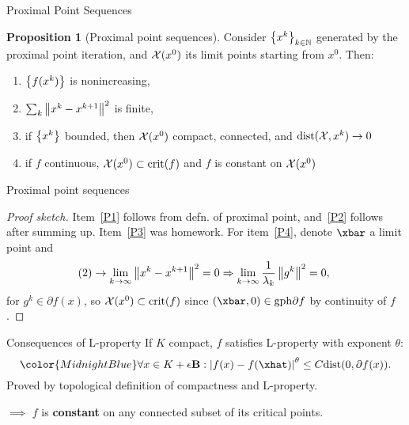 \documentclass[usenames, dvipsnames, 10pt]{beamer}
\theoremstyle{definition}
\newtheorem{proposition}{Proposition}
\begin{document}
\begin{frame}{Proximal Point Sequences}
    \begin{proposition}[Proximal point sequences] \vspace{1pt}
    Consider $\left\{ x^k \right\}_{k \in \mathbb{N}}$ generated by the proximal point iteration,
    and $\mathcal{X}(x^0)$ its limit points starting from $x^0$. Then:
    \begin{enumerate}
    \item \label{P1} $\left\{ f(x^k) \right\}$ is nonincreasing,
    \item \label{P2} $\sum_k \left \| x^k - x^{k+1} \right \|^2$ is finite,
    \item \label{P3}
    if $\left\{ x^k \right\}$ bounded, then $\mathcal{X}(x^0)$ compact, connected, and
    $\mathrm{dist}(\mathcal{X}, x^k) \to 0$
    \item \label{P4} if $f$ continuous, $\mathcal{X}(x^0) \subset \mathrm{crit}(f)$ and
    $f$ is
    constant on $\mathcal{X}(x^0)$
    \end{enumerate}
    \end{proposition}
\end{frame}
\begin{frame}{Proximal point sequences}
    \begin{proof}[Proof sketch] \vspace{1pt}
        Item~\eqref{P1} follows from defn. of proximal point, and~\eqref{P2}
        follows after summing up. Item~\eqref{P3} was homework. For
        item~\eqref{P4}, denote $\xbar$ a limit point and
        \[
            (2) \to \lim_{k \to \infty} \left \| x^k - x^{k+1} \right \|^2 = 0
            \Rightarrow \lim_{k \to \infty}
            \frac{1}{\lambda_k} \left \| g^k \right \|^2 = 0, \;
        \]
        for $g^k \in \partial f(x)$,
        so $\mathcal{X}(x^0) \subset \mathrm{crit}(f)$ since
        $(\xbar, 0) \in \gph \partial f$ by continuity of $f$.
    \end{proof}
\end{frame}

\begin{frame}{Consequences of L-property}
    If $K$ compact, $f$ satisfies L-property with exponent $\theta$:
    \[
        \color{MidnightBlue}
        \forall x \in K + \epsilon \mathbf{B}:
        \abs{f(x) - f(\xhat)}^{\theta} \leq C \mathrm{dist}(0, \partial f(x)).
    \]
    Proved by topological definition of compactness and L-property.

        $\implies$ $f$ is \textbf{constant} on any connected subset of its
        critical points.
\end{frame}
\end{document}
